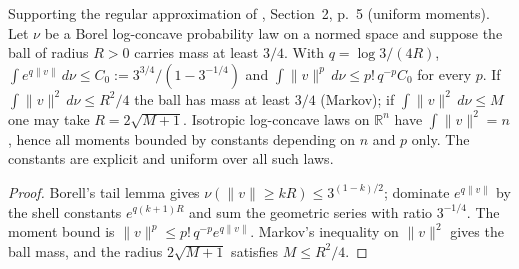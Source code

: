 \begin{lemma}
  \label{lem:bkl-borell-uniform-moments}
  \leanok
  Supporting the regular approximation of \cite{BizeulKlartagLehec2026}, Section~2, p.~5 (uniform
  moments). Let $\nu$ be a Borel log-concave probability law on a normed space and suppose the ball
  of radius $R>0$ carries mass at least $3/4$. With $q=\log 3/(4R)$,
  $\int e^{q\|v\|}\,d\nu\le C_0:=3^{3/4}/(1-3^{-1/4})$ and $\int\|v\|^p\,d\nu\le p!\,q^{-p}C_0$ for
  every $p$. If $\int\|v\|^2\,d\nu\le R^2/4$ the ball has mass at least $3/4$ (Markov); if
  $\int\|v\|^2\,d\nu\le M$ one may take $R=2\sqrt{M+1}$. Isotropic log-concave laws on
  $\mathbb R^n$ have $\int\|v\|^2=n$, hence all moments bounded by constants depending on $n$ and
  $p$ only. The constants are explicit and uniform over all such laws.
\end{lemma}
\begin{proof}
  \leanok
  Borell's tail lemma gives $\nu(\|v\|\ge kR)\le 3^{(1-k)/2}$; dominate $e^{q\|v\|}$ by the shell
  constants $e^{q(k+1)R}$ and sum the geometric series with ratio $3^{-1/4}$. The moment bound
  is $\|v\|^p\le p!\,q^{-p}e^{q\|v\|}$. Markov's inequality on $\|v\|^2$ gives the ball mass, and
  the radius $2\sqrt{M+1}$ satisfies $M\le R^2/4$.
\end{proof}

